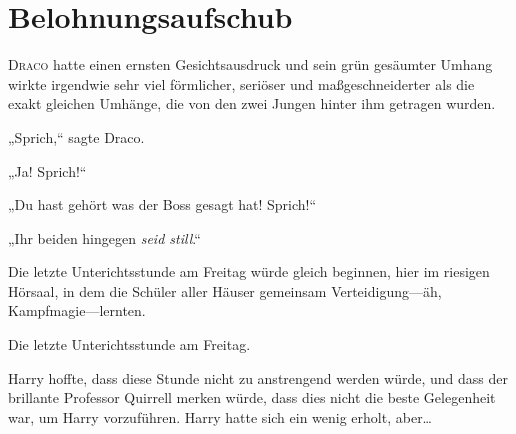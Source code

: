 \chapter{Belohnungsaufschub}


\lettrine{D}{raco} hatte einen ernsten Gesichtsausdruck und sein grün gesäumter Umhang wirkte irgendwie sehr viel förmlicher, seriöser und maßgeschneiderter als die exakt gleichen Umhänge, die von den zwei Jungen hinter ihm getragen wurden.

„Sprich,“ sagte Draco.

„Ja! Sprich!“

„Du hast gehört was der Boss gesagt hat! Sprich!“

„Ihr beiden hingegen \emph{seid still}.“

Die letzte Unterichtsstunde am Freitag würde gleich beginnen, hier im riesigen Hörsaal, in dem die Schüler aller Häuser gemeinsam Verteidigung—äh, Kampfmagie—lernten.

Die letzte Unterichtsstunde am Freitag.

Harry hoffte, dass diese Stunde nicht zu anstrengend werden würde, und dass der brillante Professor Quirrell merken würde, dass dies nicht die beste Gelegenheit war, um Harry vorzuführen. Harry hatte sich ein wenig erholt, aber…

